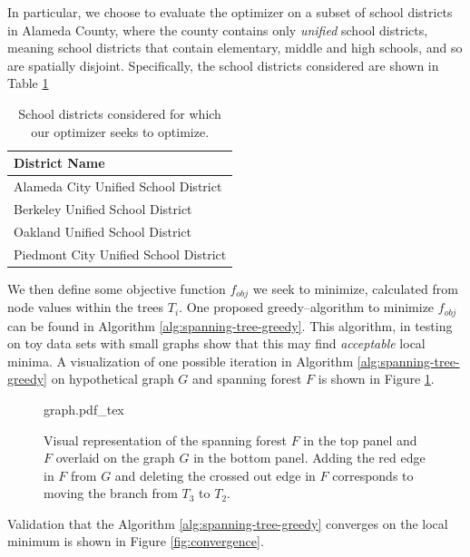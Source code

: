 \documentclass{article}
\begin{document}
In particular, we choose to evaluate the optimizer on a subset of school districts in Alameda County, where the county contains only \textit{unified} school districts, meaning school districts that contain elementary, middle and high schools, and so are spatially disjoint. Specifically, the school districts considered are shown in Table \ref{tab:school-districts}

\begin{table}[h]
    \centering
    \begin{tabular}{l}
        \textbf{District Name} \\ \hline
         Alameda City Unified School District \\
         Berkeley Unified School District \\
         Oakland Unified School District \\
         Piedmont City Unified School District \\
    \end{tabular}
    \caption{School districts considered for which our optimizer seeks to optimize.}
    \label{tab:school-districts}
\end{table}

We then define some objective function \(f_{obj}\) we seek to minimize, calculated from node values within the trees \(T_i\). One proposed greedy--algorithm to minimize \(f_{obj}\) can be found in Algorithm \ref{alg:spanning-tree-greedy}. This algorithm, in testing on toy data sets with small graphs show that this may find \textit{acceptable} local minima. A visualization of one possible iteration in Algorithm \ref{alg:spanning-tree-greedy} on hypothetical graph \(G\) and spanning forest \(F\) is shown in Figure \ref{fig:graph-example}.

\begin{figure}[H]
    \centering
    \def\svgwidth{\linewidth}
    {graph.pdf_tex}
    \caption{Visual representation of the spanning forest \(F\) in the top panel and \(F\) overlaid on the graph \(G\) in the bottom panel. Adding the red edge in \(F\) from \(G\) and deleting the crossed out edge in \(F\) corresponds to moving the branch from \(T_3\) to \(T_2\).}
    \label{fig:graph-example}
\end{figure}

Validation that the Algorithm \ref{alg:spanning-tree-greedy} converges on the local minimum is shown in Figure \ref{fig:convergence}.
\end{document}
